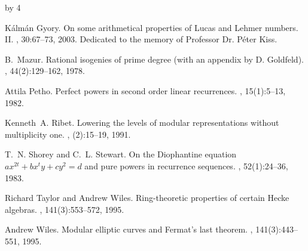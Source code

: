 \documentclass[12pt]{scrartcl}
\def\anzspalten{4}
\newlength{\kastenwidth}
\newenvironment{kasten}{%
  \begin{lrbox}{\dummybox}%
    \begin{minipage}{0.96\linewidth}}%
    {\end{minipage}%
  \end{lrbox}%
  \raisebox{-\depth}{\psshadowbox[framesep=1em]{\usebox{\dummybox}}}\\[0.5em]}
\newenvironment{spalte}{%
  \setlength\kastenwidth{1.2\textwidth}
  \divide\kastenwidth by \anzspalten
  \begin{minipage}[t]{\kastenwidth}}{\end{minipage}\hfill}
\begin{document}
\begin{lrbox}{\spalten}
{\begin{spalte}
\begin{kasten}
{\begin{thebibliography}{10}
K{\'a}lm{\'a}n Gyory.
\newblock On some arithmetical properties of {L}ucas and {L}ehmer numbers.
  {II}.
, 30:67--73,
  2003.
\newblock Dedicated to the memory of Professor Dr. P{\'e}ter Kiss.

B.~Mazur.
\newblock Rational isogenies of prime degree (with an appendix by {D}.
  {G}oldfeld).
, 44(2):129--162, 1978.



Attila Petho.
\newblock Perfect powers in second order linear recurrences.
, 15(1):5--13, 1982.

Kenneth~A. Ribet.
\newblock Lowering the levels of modular representations without multiplicity
  one.
, (2):15--19, 1991.


T.~N. Shorey and C.~L. Stewart.
\newblock On the {D}iophantine equation {$ax^{2t}+bx^{t}y+cy^{2}=d$} and pure
  powers in recurrence sequences.
, 52(1):24--36, 1983.



Richard Taylor and Andrew Wiles.
\newblock Ring-theoretic properties of certain {H}ecke algebras.
, 141(3):553--572, 1995.

Andrew Wiles.
\newblock Modular elliptic curves and {F}ermat's last theorem.
, 141(3):443--551, 1995.


\end{thebibliography}
} %
\end{kasten}

\end{spalte}
    }
    \end{lrbox}
\resizebox*{0.98\textwidth}{!}{%
  \usebox{\spalten}}\hfill\mbox{}\vfill
\end{document}
